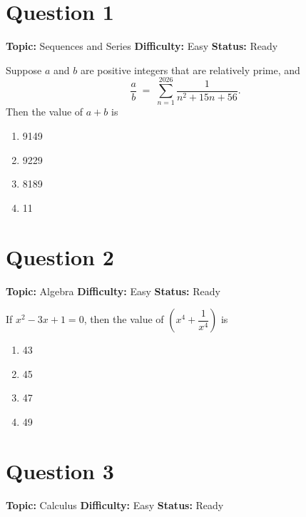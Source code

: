 \documentclass[11pt]{article}
\begin{document}
\newpage
\tableofcontents
\newpage

\section*{Question 1}


\noindent\textbf{Topic:} Sequences and Series \quad \textbf{Difficulty:} Easy \quad \textbf{Status:} Ready



Suppose $a$ and $b$ are positive integers that are relatively prime, and
\[
\frac{a}{b} \;=\; \sum_{n=1}^{2026} \frac{1}{n^2 + 15n + 56}.
\]
Then the value of $a+b$ is
\begin{enumerate}[label=(\Alph*)]
\item 9149 \item 9229 \item 8189 \item 11
\end{enumerate}

\newpage

\section*{Question 2}


\noindent\textbf{Topic:} Algebra \quad \textbf{Difficulty:} Easy \quad \textbf{Status:} Ready



If $x^2 - 3x + 1 = 0$, then the value of $\left(x^4 + \dfrac{1}{x^4}\right)$ is
\begin{enumerate}[label=(\Alph*)]
\item 43 \item 45 \item 47 \item 49
\end{enumerate}

\newpage

\section*{Question 3}


\noindent\textbf{Topic:} Calculus \quad \textbf{Difficulty:} Easy \quad \textbf{Status:} Ready
\end{document}
